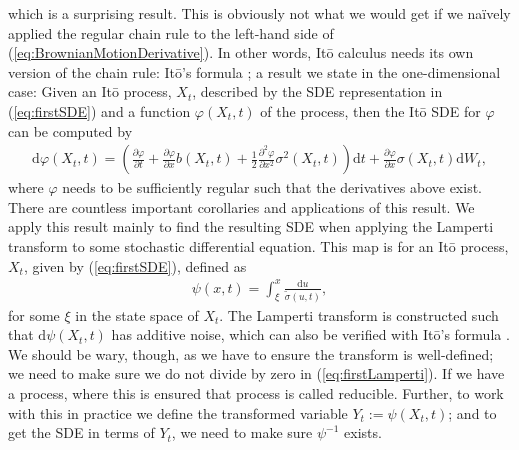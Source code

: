 which is a surprising result. This is obviously not what we would get if we naïvely applied the regular chain rule to the left-hand side of (\ref{eq:BrownianMotionDerivative}). In other words, Itō calculus needs its own version of the chain rule: Itō's formula \cite[Theorem 4.2]{Srkk2019}; a result we state in the one-dimensional case:  Given an Itō process, $X_t$, described by the SDE representation in (\ref{eq:firstSDE}) and a function $\varphi(X_t, t)$ of the process, then the Itō SDE for $\varphi$ can be computed by
\begin{align}
    \mathrm{d}\varphi(X_t, t) = \left(\frac{\partial \varphi}{\partial t} + \frac{\partial\varphi}{\partial x}b(X_t, t) + \frac{1}{2} \frac{\partial^2 \varphi}{\partial x^2}\sigma^2(X_t, t) \right)\mathrm{d}t + \frac{\partial\varphi}{\partial x}\sigma(X_t, t) \mathrm{d}W_t, \label{eq:ItoFormula}
\end{align}
where $\varphi$ needs to be sufficiently regular such that the derivatives above exist. 
There are countless important corollaries and applications of this result. We apply this result mainly to find the resulting SDE when applying the Lamperti transform to some stochastic differential equation. This map is for an Itō process, $X_t$, given by (\ref{eq:firstSDE}), defined as
\begin{align}
    \psi(x, t) = \int_{\xi}^x \frac{\mathrm{d}u}{\tilde{\sigma}(u, t)}, \label{eq:firstLamperti}
\end{align}
for some $\xi$ in the state space of $X_t$. The Lamperti transform is constructed such that $\mathrm{d}\psi(X_t, t)$ has additive noise, which can also be verified with Itō's formula \cite[equation (7.5)]{Srkk2019}. We should be wary, though, as we have to ensure the transform is well-defined; we need to make sure we do not divide by zero in (\ref{eq:firstLamperti}). If we have a process, where this is ensured that process is called reducible. Further, to work with this in practice we define the transformed variable $Y_t := \psi(X_t, t)$; and to get the SDE in terms of $Y_t$, we need to make sure $\psi^{-1}$ exists.

